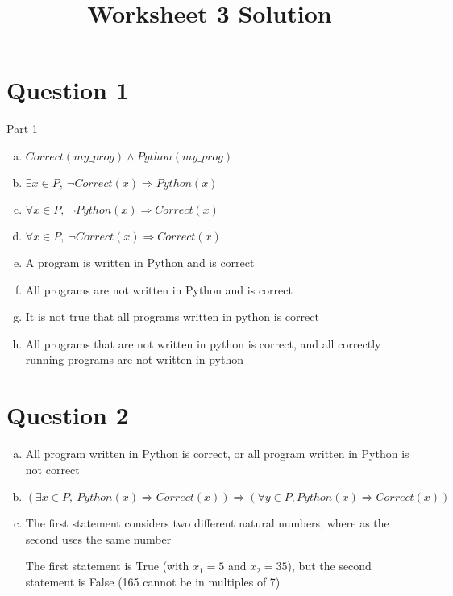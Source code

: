 \documentclass[12pt]{article}
\begin{document}
\title{Worksheet 3 Solution}
\maketitle

\section*{Question 1}

Part 1
\begin{enumerate}[a)]
    \item
        $Correct(my\_prog) \land Python(my\_prog)$
    \item
        $\exists x \in P,\: \neg Correct(x) \Rightarrow Python(x)$
    \item
        $\forall x \in P,\: \neg Python(x) \Rightarrow Correct(x)$
    \item
        $\forall x \in P,\: \neg Correct(x) \Rightarrow Correct(x)$
    \item
        A program is written in Python and is correct
    \item
        All programs are not written in Python and is correct
    \item
        It is not true that all programs written in python is correct
    \item
        All programs that are not written in python is correct, and all correctly running programs are not written in python

\end{enumerate}

\section*{Question 2}

\begin{enumerate}[a)]
    \item
        All program written in Python is correct, or all program written in Python is not correct
    \item
        $(\exists x \in P,\: Python(x) \Rightarrow Correct(x)) \Rightarrow (\forall y \in P, Python(x) \Rightarrow Correct(x))$
    \item
        The first statement considers two different natural numbers, where as the second uses the same number

        The first statement is True (with $x_1 = 5$ and $x_2 = 35$), but the second statement is False (165 cannot be in multiples of 7)
\end{enumerate}
\end{document}
